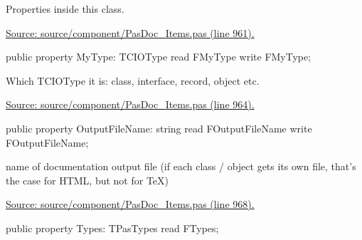 \documentclass{report}
\newif\ifpdf
\begin{document}
\begin{list}{}
\begin{flushleft}
\ifpdf
\end{flushleft}
\fi


\par Properties inside this class.\par
\href{https://github.com/pasdoc/pasdoc/blob/master/source/component/PasDoc_Items.pas#L961}{Source: source/component/PasDoc{\_}Items.pas (line 961).}\label{PasDoc_Items.TPasCio-MyType}
\item[\textbf{MyType}\hfill]
\ifpdf
\begin{flushleft}
\fi
\begin{ttfamily}
public property MyType: TCIOType read FMyType write FMyType;\end{ttfamily}

\ifpdf
\end{flushleft}
\fi


\par Which TCIOType it is: class, interface, record, object etc.\par
\href{https://github.com/pasdoc/pasdoc/blob/master/source/component/PasDoc_Items.pas#L964}{Source: source/component/PasDoc{\_}Items.pas (line 964).}\label{PasDoc_Items.TPasCio-OutputFileName}
\item[\textbf{OutputFileName}\hfill]
\ifpdf
\begin{flushleft}
\fi
\begin{ttfamily}
public property OutputFileName: string read FOutputFileName write FOutputFileName;\end{ttfamily}

\ifpdf
\end{flushleft}
\fi


\par name of documentation output file (if each class / object gets its own file, that's the case for HTML, but not for TeX)\par
\href{https://github.com/pasdoc/pasdoc/blob/master/source/component/PasDoc_Items.pas#L968}{Source: source/component/PasDoc{\_}Items.pas (line 968).}\label{PasDoc_Items.TPasCio-Types}
\item[\textbf{Types}\hfill]
\ifpdf
\begin{flushleft}
\fi
\begin{ttfamily}
public property Types: TPasTypes read FTypes;\end{ttfamily}

\ifpdf
\end{flushleft}
\fi



\end{list}
\end{document}
